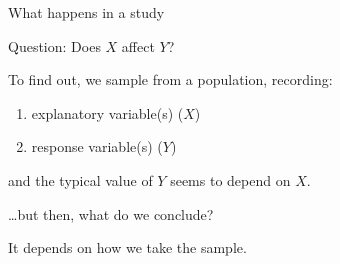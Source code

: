 \begin{frame}{What happens in a study}

    \alert{Question:} Does $X$ affect $Y$?

    \vspace{2em}

    To find out, we sample from a population, recording:
      \begin{enumerate}
          \item explanatory variable(s) ($X$)
          \item response variable(s) ($Y$)
      \end{enumerate}
    and the typical value of $Y$ seems to depend on $X$.

    \vspace{2em}

    \ldots but then, what do we conclude?

    \vspace{2em}

    \alert{It depends} on how we take the sample.

\end{frame}

